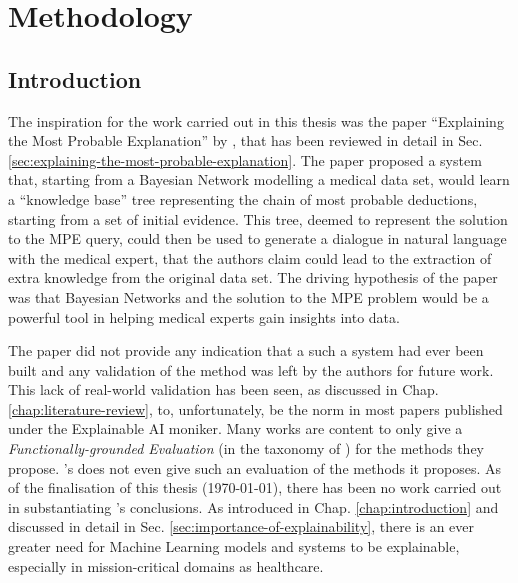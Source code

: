 \documentclass[mscthesis]{usiinfthesis}
\begin{document}
\chapter{Methodology} \label{chap:methodology}
\section{Introduction} \label{sec:methodology-introduction}
 The inspiration for the work carried out in this thesis was the paper \enquote{Explaining the Most Probable Explanation} by \cite{Butz2018}, that has been reviewed in detail in Sec. \ref{sec:explaining-the-most-probable-explanation}.
 The paper proposed a system that, starting from a Bayesian Network modelling a medical data set, would learn a \enquote{knowledge base} tree representing the chain of most probable deductions, starting from a set of initial evidence.
 This tree, deemed to represent the solution to the MPE query, could then be used to generate a dialogue in natural language with the medical expert, that the authors claim could lead to the extraction of extra knowledge from the original data set.  
 The driving hypothesis of the paper was that Bayesian Networks and the solution to the MPE problem would be a powerful tool in helping medical experts gain insights into data.
 
The paper did not provide any indication that a such a system had ever been built and any validation of the method was left by the authors for future work.
 This lack of real-world validation has been seen, as discussed in Chap. \ref{chap:literature-review}, to, unfortunately, be the norm in most papers published under the Explainable AI moniker.
 Many works are content to only give a \textit{Functionally-grounded Evaluation} (in the taxonomy of \cite{doshi2017towards}) for the methods they propose.
\cite{Butz2018}'s does not even give such an evaluation of the methods it proposes.
 As of the finalisation of this thesis (\today), there has been no work carried out in substantiating \cite{Butz2018}'s conclusions.
 As introduced in Chap. \ref{chap:introduction} and discussed in detail in Sec. \ref{sec:importance-of-explainability}, there is an ever greater need for Machine Learning models and systems to be explainable, especially in mission-critical domains as healthcare.
 
\end{document}

